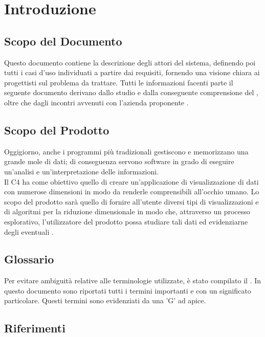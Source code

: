 \section{Introduzione}
\subsection{Scopo del Documento}
Questo documento contiene la descrizione degli attori del sistema, definendo poi tutti i casi d'uso individuati a partire dai requisiti, fornendo una visione chiara ai progettisti sul problema da trattare. Tutti le informazioni facenti parte il seguente documento derivano dallo studio e dalla conseguente comprensione del , oltre che dagli incontri avvenuti con l'azienda proponente \Proponente{}.
\subsection{Scopo del Prodotto}
Oggigiorno, anche i programmi più tradizionali gestiscono e memorizzano una grande mole di dati; di conseguenza servono software in grado di eseguire un'analisi e un'interpretazione delle informazioni.\\
Il  C4 ha come obiettivo quello di creare un'applicazione di visualizzazione di dati con numerose dimensioni in modo da renderle comprensibili all'occhio umano.  Lo scopo del prodotto sarà quello di fornire all'utente diversi tipi di visualizzazioni e di algoritmi per la riduzione dimensionale in modo che, attraverso un processo esplorativo, l'utilizzatore del prodotto possa studiare tali dati ed evidenziarne degli eventuali . 
\subsection{Glossario}
Per evitare ambiguità relative alle terminologie utilizzate, è stato compilato il . In questo documento sono riportati tutti i termini importanti e con un significato particolare. Questi termini sono evidenziati da una 'G' ad apice.
\subsection{Riferimenti}
